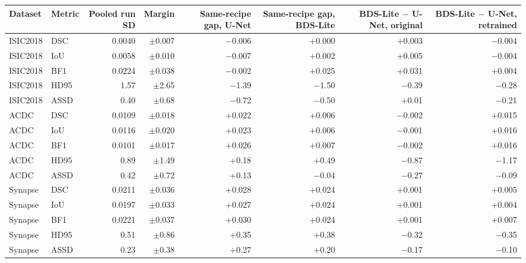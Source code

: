 \begin{tabular}{llrrrrrr}
\toprule
Dataset & Metric & Pooled run SD & Margin & Same-recipe gap, U-Net & Same-recipe gap, BDS-Lite & BDS-Lite $-$ U-Net, original & BDS-Lite $-$ U-Net, retrained \\
\midrule
ISIC2018 & DSC & 0.0040 & $\pm$0.007 & $-$0.006 & +0.000 & +0.003 & $-$0.004 \\
ISIC2018 & IoU & 0.0058 & $\pm$0.010 & $-$0.007 & +0.002 & +0.005 & $-$0.004 \\
ISIC2018 & BF1 & 0.0224 & $\pm$0.038 & $-$0.002 & +0.025 & +0.031 & +0.004 \\
ISIC2018 & HD95 & 1.57 & $\pm$2.65 & $-$1.39 & $-$1.50 & $-$0.39 & $-$0.28 \\
ISIC2018 & ASSD & 0.40 & $\pm$0.68 & $-$0.72 & $-$0.50 & +0.01 & $-$0.21 \\
\midrule
ACDC & DSC & 0.0109 & $\pm$0.018 & +0.022 & +0.006 & $-$0.002 & +0.015 \\
ACDC & IoU & 0.0116 & $\pm$0.020 & +0.023 & +0.006 & $-$0.001 & +0.016 \\
ACDC & BF1 & 0.0101 & $\pm$0.017 & +0.026 & +0.007 & $-$0.002 & +0.016 \\
ACDC & HD95 & 0.89 & $\pm$1.49 & +0.18 & +0.49 & $-$0.87 & $-$1.17 \\
ACDC & ASSD & 0.42 & $\pm$0.72 & +0.13 & $-$0.04 & $-$0.27 & $-$0.09 \\
\midrule
Synapse & DSC & 0.0211 & $\pm$0.036 & +0.028 & +0.024 & +0.001 & +0.005 \\
Synapse & IoU & 0.0197 & $\pm$0.033 & +0.027 & +0.024 & +0.001 & +0.004 \\
Synapse & BF1 & 0.0221 & $\pm$0.037 & +0.030 & +0.024 & +0.001 & +0.007 \\
Synapse & HD95 & 0.51 & $\pm$0.86 & +0.35 & +0.38 & $-$0.32 & $-$0.35 \\
Synapse & ASSD & 0.23 & $\pm$0.38 & +0.27 & +0.20 & $-$0.17 & $-$0.10 \\
\bottomrule
\end{tabular}
